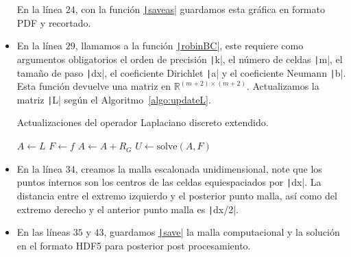 \begin{problem}
\begin{itemize}
          En la línea $24$, con la función
          \href{https://docs.octave.org/latest/Printing-and-Saving-Plots.html}{\texttt|saveas|}
          guardamos esta gráfica en formato PDF y recortado.

    \item

          En la línea $29$, llamamos a la función
          \href{https://carlosal1015.github.io/mole_examples/api_docs/matlab/src/matlab/robinBC.html}{\texttt|robinBC|},
          este requiere como argumentos obligatorios el orden de
          precisión \texttt|k|, el número  de celdas
          \texttt|m|, el tamaño de paso
          \texttt|dx|, el coeficiente Dirichlet
          \texttt|a| y el coeficiente Neumann
          \texttt|b|.
          Esta función devuelve una matriz en
          \begin{math}
              \mathbb{R}^{\left(m+2\right)\times\left(m+2\right)}
          \end{math}.
          Actualizamos la matriz \texttt|L| según el
          Algoritmo~\ref{algo:updateL}.

          \begin{algorithm}[H]
              \caption{Actualizaciones del operador Laplaciano discreto extendido.}\label{algo:updateL}
              $A\leftarrow L$\;
              $F\leftarrow f$\;
              $A\leftarrow A+R_{G}$\;
              $U\leftarrow \text{solve}\left(A, F\right)$\;
          \end{algorithm}

    \item

          En la línea $34$, creamos la malla escalonada
          unidimensional, note que los puntos internos son los
          centros de las celdas equiespaciados por
          \texttt|dx|.
          La distancia entre el extremo izquierdo y el posterior
          punto malla, así como del extremo derecho y el anterior
          punto malla es \texttt|dx/2|.

    \item

          En las líneas $35$ y $43$, guardamos
          \href{https://docs.octave.org/latest/Simple-File-I_002fO.html#index-save-6}{\texttt|save|}
          la malla computacional y la solución en el formato HDF5
          para posterior post procesamiento.


\end{itemize}
\end{problem}
